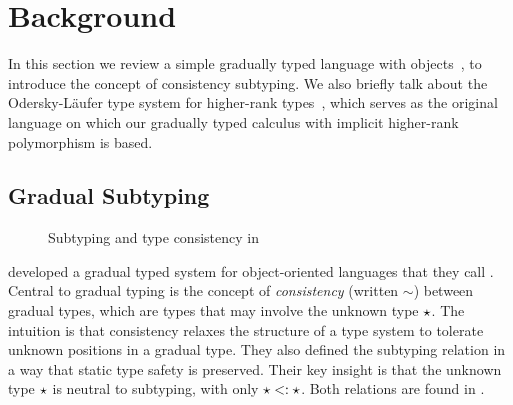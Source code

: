 \section{Background}
\label{sec:background}

In this section we review a simple gradually typed language with
objects~\cite{siek2007gradual}, to introduce the concept of consistency
subtyping. We also briefly talk about the Odersky-L{\"a}ufer type system for
higher-rank types~\cite{odersky1996putting}, which serves as the original
language on which our gradually typed calculus with implicit
higher-rank polymorphism is based.


\subsection{Gradual Subtyping}

\begin{figure}[t]
  \begin{small}


  \end{small}

  \caption{Subtyping and type consistency in \obb}
  \label{fig:objects}
\end{figure}

\citet{siek2007gradual} developed a gradual typed system for object-oriented
languages that they call \obb. Central to gradual typing is the concept of
\textit{consistency} (written $\sim$) between gradual types, which are types
that may involve the unknown type $\star$. The intuition is that consistency
relaxes the structure of a type system to tolerate unknown positions in a
gradual type. They also defined the subtyping relation in a way that static type
safety is preserved. Their key insight is that the unknown type $\star$ is
neutral to subtyping, with only $\star <: \star$. Both relations are
found in .

